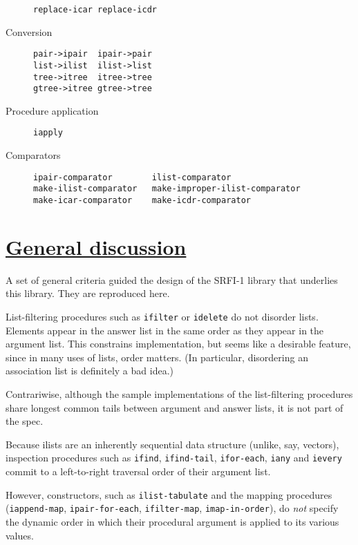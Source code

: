 \begin{description}
\begin{verbatim}
replace-icar replace-icdr
\end{verbatim}
\item[ Conversion ]
\begin{verbatim}
pair->ipair  ipair->pair
list->ilist  ilist->list
tree->itree  itree->tree
gtree->itree gtree->tree
\end{verbatim}
\item[ Procedure application ]
\begin{verbatim}
iapply
\end{verbatim}
\item[ Comparators ]
\begin{verbatim}
ipair-comparator        ilist-comparator
make-ilist-comparator   make-improper-ilist-comparator
make-icar-comparator    make-icdr-comparator
\end{verbatim}
\end{description}

\section{\texorpdfstring{\href{}{General
discussion}}{General discussion}}\label{general-discussion}

A set of general criteria guided the design of the SRFI-1 library that
underlies this library. They are reproduced here.

List-filtering procedures such as \texttt{ifilter} or \texttt{idelete}
do not disorder lists. Elements appear in the answer list in the same
order as they appear in the argument list. This constrains
implementation, but seems like a desirable feature, since in many uses
of lists, order matters. (In particular, disordering an association list
is definitely a bad idea.)

Contrariwise, although the sample implementations of the list-filtering
procedures share longest common tails between argument and answer lists,
it is not part of the spec.

Because ilists are an inherently sequential data structure (unlike, say,
vectors), inspection procedures such as \texttt{ifind},
\texttt{ifind-tail}, \texttt{ifor-each}, \texttt{iany} and
\texttt{ievery} commit to a left-to-right traversal order of their
argument list.

However, constructors, such as \texttt{ilist-tabulate} and the mapping
procedures (\texttt{iappend-map}, \texttt{ipair-for-each},
\texttt{ifilter-map}, \texttt{imap-in-order}), do \emph{not} specify the
dynamic order in which their procedural argument is applied to its
various values.

